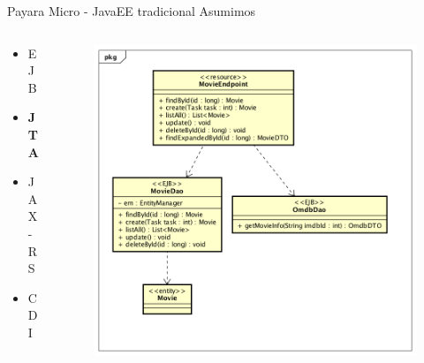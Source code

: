 \documentclass{beamer}
\begin{document}
\begin{frame}{Payara Micro - JavaEE tradicional}
Asumimos
\begin{columns}[T] %
	\begin{column}[T]{3cm} %
		\begin{itemize}
			\item EJB
			\item \textbf{JTA}
			\item JAX-RS
			\item CDI
		\end{itemize}
	\end{column}
	\begin{column}[T]{7cm} %
\begin{figure}
	\centering
	\includegraphics[width=\linewidth]{Images/democlass}
\end{figure}
	\end{column}
\end{columns}
\end{frame}
\end{document}
